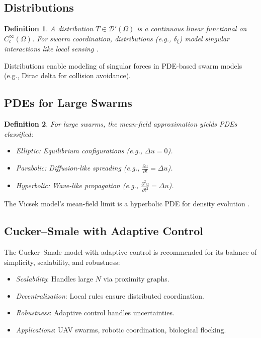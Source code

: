 \documentclass{article}
\theoremstyle{plain}
\newtheorem{definition}{Definition}[section]
\begin{document}
\subsection{Distributions}

\begin{definition}
A \emph{distribution} \(T \in \mathcal{D}'(\Omega)\) is a continuous linear functional on \(C^\infty_c(\Omega)\). For swarm coordination, distributions (e.g., \(\delta_\xi\)) model singular interactions like local sensing \cite{nLab_distributions}.
\end{definition}

Distributions enable modeling of singular forces in PDE-based swarm models (e.g., Dirac delta for collision avoidance).

\subsection{PDEs for Large Swarms}

\begin{definition}
For large swarms, the mean-field approximation yields PDEs classified:
\begin{itemize}
    \item \emph{Elliptic}: Equilibrium configurations (e.g., \(\Delta u = 0\)).
    \item \emph{Parabolic}: Diffusion-like spreading (e.g., \(\frac{\partial u}{\partial t} = \Delta u\)).
    \item \emph{Hyperbolic}: Wave-like propagation (e.g., \(\frac{\partial^2 u}{\partial t^2} = \Delta u\)).
\end{itemize}
\end{definition}

The Vicsek model’s mean-field limit is a hyperbolic PDE for density evolution \cite{vicsek_model}.

\subsection{Cucker--Smale with Adaptive Control}

The Cucker--Smale model with adaptive control is recommended for its balance of simplicity, scalability, and robustness:
\begin{itemize}
    \item \emph{Scalability}: Handles large \(N\) via proximity graphs.
    \item \emph{Decentralization}: Local rules ensure distributed coordination.
    \item \emph{Robustness}: Adaptive control handles uncertainties.
    \item \emph{Applications}: UAV swarms, robotic coordination, biological flocking.
\end{itemize}
\end{document}
